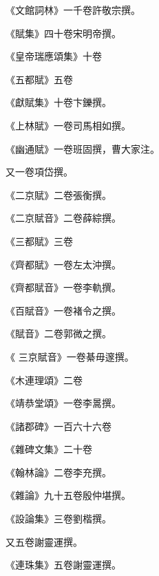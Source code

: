 \begin{pinyinscope}
 《文館詞林》一千卷許敬宗撰。



 《賦集》四十卷宋明帝撰。



 《皇帝瑞應頌集》十卷



 《五都賦》五卷



 《獻賦集》十卷卞鑠撰。



 《上林賦》一卷司馬相如撰。



 《幽通賦》一卷班固撰，曹大家注。



 又一卷項岱撰。



 《二京賦》二卷張衡撰。



 《二京賦音》二卷薛綜撰。



 《三都賦》三卷



 《齊都賦》一卷左太沖撰。



 《齊都賦音》一卷李軌撰。



 《百賦音》一卷褚令之撰。



 《賦音》二卷郭微之撰。



 《
 三京賦音》一卷綦毋邃撰。



 《木連理頌》二卷



 《靖恭堂頌》一卷李暠撰。



 《諸郡碑》一百六十六卷



 《雜碑文集》二十卷



 《翰林論》二卷李充撰。



 《雜論》九十五卷殷仲堪撰。



 《設論集》三卷劉楷撰。



 又五卷謝靈運撰。



 《連珠集》五卷謝靈運撰。




\end{pinyinscope}
